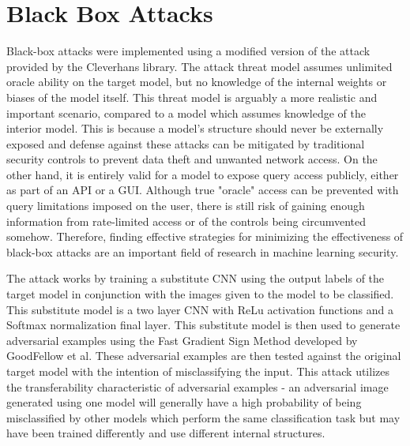 \section{Black Box Attacks} \label{s:blackboxattacks}
Black-box attacks were implemented using a modified version of the attack provided by the Cleverhans library\cite{papernot2018cleverhans}.
The attack threat model assumes unlimited oracle ability on the target model, but no knowledge of the internal weights or biases of the model itself.
This threat model is arguably a more realistic and important scenario, compared to a model which assumes knowledge of the interior model.
This is because a model's structure should never be externally exposed and defense against these attacks can be mitigated by traditional security controls to prevent data theft and unwanted network access.
On the other hand, it is entirely valid for a model to expose query access publicly, either as part of an API or a GUI. Although true "oracle" access can be prevented with query limitations imposed on the user, there is still risk of gaining enough information from rate-limited access or of the controls being circumvented somehow.
Therefore, finding effective strategies for minimizing the effectiveness of black-box attacks are an important field of research in machine learning security.

The attack works by training a substitute CNN using the output labels of the target model in conjunction with the images given to the model to be classified.
This substitute model is a two layer CNN with ReLu activation functions and a Softmax normalization final layer.
This substitute model is then used to generate adversarial examples using the Fast Gradient Sign Method developed by GoodFellow et al.
These adversarial examples are then tested against the original target model with the intention of misclassifying the input.
This attack utilizes the transferability characteristic of adversarial examples - an adversarial image generated using one model will generally have a high probability of being misclassified by other models which perform the same classification task but may have been trained differently and use different internal structures.

